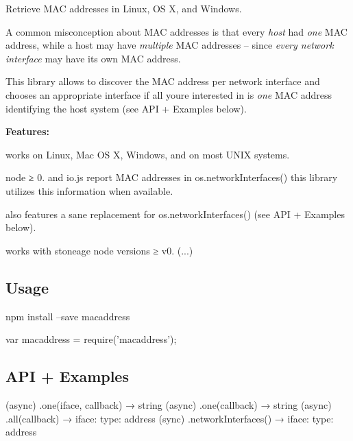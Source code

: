 \href{https://travis-ci.org/scravy/node-macaddress}{\tt }

Retrieve M\+AC addresses in Linux, OS X, and Windows.

A common misconception about M\+AC addresses is that every {\itshape host} had {\itshape one} M\+AC address, while a host may have {\itshape multiple} M\+AC addresses – since {\itshape every network interface} may have its own M\+AC address.

This library allows to discover the M\+AC address per network interface and chooses an appropriate interface if all you\textquotesingle{}re interested in is {\itshape one} M\+AC address identifying the host system (see {\ttfamily A\+PI + Examples} below).

{\bfseries Features\+:}


\begin{DoxyItemize}
\item works on {\ttfamily Linux}, {\ttfamily Mac OS X}, {\ttfamily Windows}, and on most {\ttfamily U\+N\+IX} systems.
\item {\ttfamily node ≥ 0.} and {\ttfamily io.\+js} report M\+AC addresses in {\ttfamily os.\+network\+Interfaces()} this library utilizes this information when available.
\item also features a sane replacement for {\ttfamily os.\+network\+Interfaces()} (see {\ttfamily A\+PI + Examples} below).
\item works with stoneage node versions ≥ v0. (...)
\end{DoxyItemize}

\subsection*{Usage }


\begin{DoxyCode}
npm install --save macaddress
\end{DoxyCode}



\begin{DoxyCode}
var macaddress = require('macaddress');
\end{DoxyCode}


\subsection*{A\+PI + Examples }

\begin{DoxyVerb}(async)  .one(iface, callback) → string
(async)  .one(callback)        → string
(async)  .all(callback)        → { iface: { type: address } }
(sync)   .networkInterfaces()  → { iface: { type: address } }
\end{DoxyVerb}






